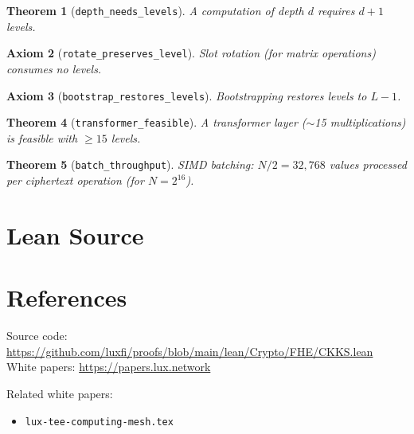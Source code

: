 \documentclass[11pt]{article}
\newtheorem{theorem}{Theorem}
\newtheorem{axiom_stmt}[theorem]{Axiom}
\begin{document}
\begin{theorem}[\texttt{depth\_needs\_levels}]
A computation of depth $d$ requires $d+1$ levels.
\end{theorem}

\begin{axiom_stmt}[\texttt{rotate\_preserves\_level}]
Slot rotation (for matrix operations) consumes no levels.
\end{axiom_stmt}

\begin{axiom_stmt}[\texttt{bootstrap\_restores\_levels}]
Bootstrapping restores levels to $L-1$.
\end{axiom_stmt}

\begin{theorem}[\texttt{transformer\_feasible}]
A transformer layer ($\sim$15 multiplications) is feasible with $\geq 15$ levels.
\end{theorem}

\begin{theorem}[\texttt{batch\_throughput}]
SIMD batching: $N/2 = 32{,}768$ values processed per ciphertext operation (for $N=2^{16}$).
\end{theorem}


\section{Lean Source}


\section{References}
\noindent Source code: \url{https://github.com/luxfi/proofs/blob/main/lean/Crypto/FHE/CKKS.lean}\\
\noindent White papers: \url{https://papers.lux.network}

\noindent Related white papers:
\begin{itemize}
  \item \texttt{lux-tee-computing-mesh.tex}
\end{itemize}
\end{document}
